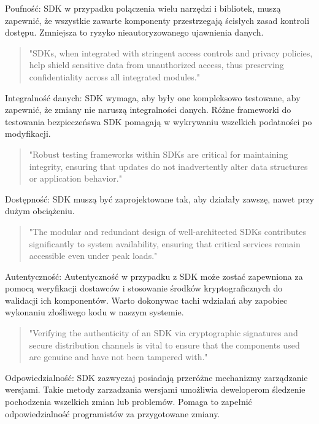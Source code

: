\documentclass[runningheads,12pt]{llncs}
\begin{document}
Poufność: SDK w przypadku polączenia wielu narzędzi i bibliotek, muszą zapewnić, że wszystkie zawarte komponenty przestrzegają ścisłych zasad kontroli dostępu. Zmniejsza to ryzyko nieautoryzowanego ujawnienia danych.

\begin{quote}
    "SDKs, when integrated with stringent access controls and privacy policies, help shield sensitive data from unauthorized access, thus preserving confidentiality across all integrated modules." ~\cite[para 4]{azure2020}
\end{quote}

Integralność danych: SDK wymaga, aby były one kompleksowo testowane, aby zapewnić, że zmiany nie naruszą integralności danych. Różne frameworki do testowania bezpieczeńswa SDK pomagają w wykrywaniu wszelkich podatności po modyfikacji.

\begin{quote}
    "Robust testing frameworks within SDKs are critical for maintaining integrity, ensuring that updates do not inadvertently alter data structures or application behavior." ~\cite[para 5]{azure2020}
\end{quote}

Dostępność: SDK muszą być zaprojektowane tak, aby działały zawszę, nawet przy dużym obciążeniu. 

\begin{quote}
    "The modular and redundant design of well-architected SDKs contributes significantly to system availability, ensuring that critical services remain accessible even under peak loads." ~\cite[para 6]{azure2020}
\end{quote}

Autentyczność: Autentyczność w przypadku z SDK może zostać zapewniona za pomocą weryfikacji dostawców i stosowanie środków kryptograficznych do walidacji ich komponentów. Warto dokonywac tachi wdziałań aby zapobiec wykonaniu złośliwego kodu w naszym systemie.

\begin{quote}
    "Verifying the authenticity of an SDK via cryptographic signatures and secure distribution channels is vital to ensure that the components used are genuine and have not been tampered with." ~\cite[para 7]{azure2020}
\end{quote}

Odpowiedzialność: SDK zazwyczaj posiadają przeróżne mechanizmy zarządzanie wersjami. Takie metody zarzadzania wersjami umożliwia deweloperom śledzenie pochodzenia wszelkich zmian lub problemów. Pomaga to zapełnić odpowiedzialność programistów za przygotowane zmiany.
\end{document}
